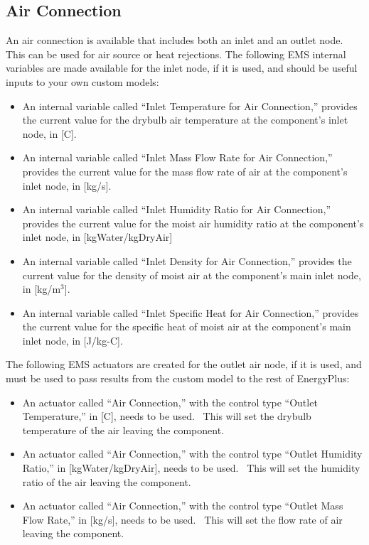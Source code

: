 \subsection{Air Connection}\label{air-connection}

An air connection is available that includes both an inlet and an outlet node.~ This can be used for air source or heat rejections. The following EMS internal variables are made available for the inlet node, if it is used, and should be useful inputs to your own custom models:

\begin{itemize}
\item
  An internal variable called ``Inlet Temperature for Air Connection,'' provides the current value for the drybulb air temperature at the component's inlet node, in {[}C{]}.
\item
  An internal variable called ``Inlet Mass Flow Rate for Air Connection,'' provides the current value for the mass flow rate of air at the component's inlet node, in {[}kg/s{]}.
\item
  An internal variable called ``Inlet Humidity Ratio for Air Connection,'' provides the current value for the moist air humidity ratio at the component's inlet node, in {[}kgWater/kgDryAir{]}
\item
  An internal variable called ``Inlet Density for Air Connection,'' provides the current value for the density of moist air at the component's main inlet node, in {[}kg/m\(^{3}\){]}.
\item
  An internal variable called ``Inlet Specific Heat for Air Connection,'' provides the current value for the specific heat of moist air at the component's main inlet node, in {[}J/kg-C{]}.
\end{itemize}

The following EMS actuators are created for the outlet air node, if it is used, and must be used to pass results from the custom model to the rest of EnergyPlus:

\begin{itemize}
\item
  An actuator called ``Air Connection,'' with the control type ``Outlet Temperature,'' in {[}C{]}, needs to be used.~ This will set the drybulb temperature of the air leaving the component.
\item
  An actuator called ``Air Connection,'' with the control type ``Outlet Humidity Ratio,'' in {[}kgWater/kgDryAir{]}, needs to be used.~ This will set the humidity ratio of the air leaving the component.
\item
  An actuator called ``Air Connection,'' with the control type ``Outlet Mass Flow Rate,'' in {[}kg/s{]}, needs to be used.~ This will set the flow rate of air leaving the component.
\end{itemize}


